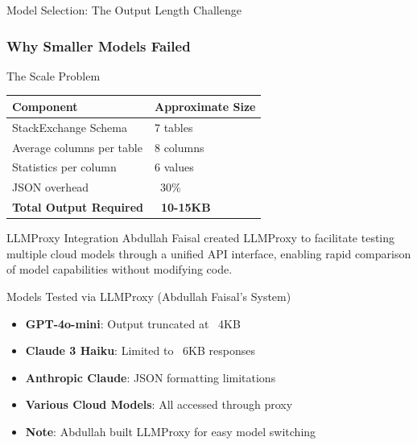 \documentclass{beamer}
\begin{document}
\begin{frame}{Model Selection: The Output Length Challenge}
\frametitle{Why Smaller Models Failed}

\begin{block}{The Scale Problem}
\begin{tabular}{ll}
\toprule
Component & Approximate Size \\
\midrule
StackExchange Schema & 7 tables \\
Average columns per table & 8 columns \\
Statistics per column & 6 values \\
JSON overhead & ~30\% \\
\textbf{Total Output Required} & \textbf{~10-15KB} \\
\bottomrule
\end{tabular}
\end{block}

\begin{alertblock}{LLMProxy Integration}
Abdullah Faisal created LLMProxy to facilitate testing multiple cloud models through a unified API interface, enabling rapid comparison of model capabilities without modifying code.
\end{alertblock}

\begin{exampleblock}{Models Tested via LLMProxy (Abdullah Faisal's System)}
\begin{itemize}
    \item \textbf{GPT-4o-mini}: Output truncated at ~4KB
    \item \textbf{Claude 3 Haiku}: Limited to ~6KB responses
    \item \textbf{Anthropic Claude}: JSON formatting limitations
    \item \textbf{Various Cloud Models}: All accessed through proxy
    \item \textbf{Note}: Abdullah built LLMProxy for easy model switching
\end{itemize}
\end{exampleblock}

\end{frame}
\end{document}
